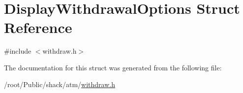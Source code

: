 \hypertarget{structDisplayWithdrawalOptions}{\section{Display\-Withdrawal\-Options Struct Reference}
\label{structDisplayWithdrawalOptions}
}


{\ttfamily \#include $<$withdraw.\-h$>$}



The documentation for this struct was generated from the following file\-:\begin{DoxyCompactItemize}
\item 
/root/\-Public/shack/atm/\hyperlink{withdraw_8h}{withdraw.\-h}\end{DoxyCompactItemize}
